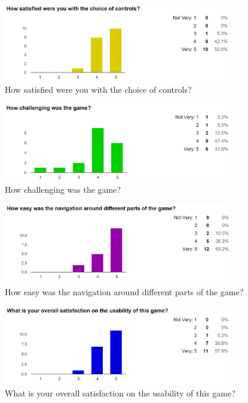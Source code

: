 \documentclass[12pt]{article}
\begin{document}
\begin{figure}[H]
	\centering
	\includegraphics[width = 10cm]{Controls}
	\caption{How satisfied were you with the choice of controls?}
	\label{How satisfied were you with the choice of controls?}
\end{figure}

\begin{figure}[H]
	\centering
	\includegraphics[width = 10cm]{Challenging}
	\caption{How challenging was the game?}
	\label{How challenging was the game?}
\end{figure}

\begin{figure}[H]
	\centering
	\includegraphics[width = 10cm]{Navigation}
	\caption{How easy was the navigation around different parts of the game?}
	\label{How easy was the navigation around different parts of the game?}
\end{figure}

\begin{figure}[H]
	\centering
	\includegraphics[width = 10cm]{Overall_Satisfaction}
	\caption{What is your overall satisfaction on the usability of this game?}
	\label{What is your overall satisfaction on the usability of this game?}
\end{figure}
\vfill
\end{document}
